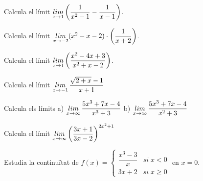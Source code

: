  \vspace{0.25cm}
\begin{autoaval}{32}
\begin{mylist}
	
	
	\exer[2] Calcula el límit $\mathop{lim}\limits_{x\to 1} \left(\dfrac{1}{x^{2} -1} -\dfrac{1}{x-1} \right)$.
	
	
	\exer[2] Calcula el límit $\mathop{lim}\limits_{x\to -2} (x^{2} -x-2)\cdot \left(\dfrac{1}{x+2} \right)$.

	\exer[2] Calcula el límit $\mathop{lim}\limits_{x\to 1} \left(\dfrac{x^{2} -4x+3}{x^{2} +x-2} \right)$.
	
	\exer[2] Calcula el límit $\mathop{lim}\limits_{x\to -1} \dfrac{\sqrt{2+x} -1}{x+1} $
	
 
		
		\exer[2] Calcula els límits a) $\mathop{lim}\limits_{x\to \infty } \dfrac{5x^{3} +7x-4}{x^{3} +3}$ \quad b) $\mathop{lim}\limits_{x\to \infty } \dfrac{5x^{3} +7x-4}{x^{2} +3}$  
		


	\exer[2] Calcula el límit $\mathop{lim}\limits_{x\to \infty } \left(\dfrac{3x+1}{3x-2} \right)^{2x^{2} +1} $ 
	\answers{$\infty$}
 

	\exer[2] Estudia la continuïtat de $f(x)=\left\{\begin{array}{cc} {\dfrac{x^{3} -3}{x} } & {si\; x<0} \\ {3x+2} & {si\; x\ge 0} \end{array}\right. $  en $x=0$. 


\end{mylist}
\end{autoaval}

